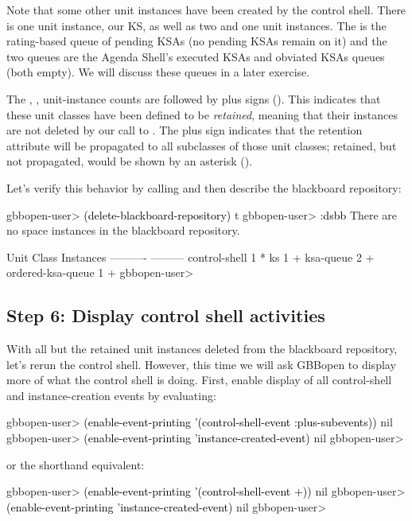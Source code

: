 \documentclass[10pt,twoside,english,pdftex]{article}
\begin{document}
Note that some other unit instances have been created by the control shell.
There is one  unit instance, our  KS, as well
as two  and one  unit
instances.  The  is the rating-based queue of
pending KSAs (no pending KSAs remain on it) and the two
 queues are the Agenda Shell's executed KSAs and
obviated KSAs queues (both empty).  We will discuss these queues in a later
exercise.

The , , 
unit-instance counts are followed by plus signs (\code{+}).  This indicates
that these unit classes have been defined to be \textit{retained}, meaning
that their instances are not deleted by our call to
.  The plus sign indicates that
the retention attribute will be propagated to all subclasses of those unit
classes; retained, but not propagated, would be shown by an asterisk
(\code{*}).

%
%
Let's verify this behavior by calling
 and then describe the blackboard
repository:
%
\W\supp
\begin{example}
\textcolor{darkergray}{%
  gbbopen-user> \textcolor{black}{(delete-blackboard-repository)}
  t
  gbbopen-user> \textcolor{black}{:dsbb}
  There are no space instances in the blackboard repository.

  Unit Class                    Instances
  ----------                    ---------
  control-shell                         1 *
  ks                                    1 +
  ksa-queue                             2 +
  ordered-ksa-queue                     1 +
  gbbopen-user>}
\end{example}

\subsection*{Step 6: Display control shell activities}

With all but the retained unit instances deleted from the blackboard
repository, let's rerun the control shell.  However, this time we will ask
GBBopen to display more of what the control shell is doing. First, enable
display of all control-shell and instance-creation events by evaluating:
%
\W\supp
\begin{example}
\textcolor{darkergray}{%
  gbbopen-user> \textcolor{black}{(enable-event-printing '(control-shell-event :plus-subevents))}
  nil
  gbbopen-user> \textcolor{black}{(enable-event-printing 'instance-created-event)}
  nil
  gbbopen-user>}
\end{example}
%
or the shorthand equivalent:
%
\W\supp\notpretop
\begin{example}
\textcolor{darkergray}{%
  gbbopen-user> \textcolor{black}{(enable-event-printing '(control-shell-event +))}
  nil
  gbbopen-user> \textcolor{black}{(enable-event-printing 'instance-created-event)}
  nil
  gbbopen-user>}
\end{example}
\end{document}
